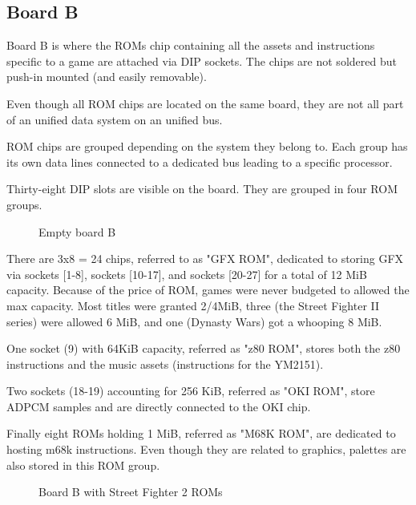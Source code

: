 \label{fig:boarda}

\label{fig:drawboarda}

\subsection{Board B}
   Board B is where the ROMs chip containing all the assets and instructions specific to a game are attached via DIP sockets. The chips are not soldered but push-in mounted (and easily removable).

   Even though all ROM chips are located on the same board, they are not all part of an unified data system on an unified bus. 

   ROM chips are grouped depending on the system they belong to. Each group has its own data lines connected to a dedicated bus leading to a specific processor. 

   Thirty-eight DIP slots are visible on the board. They are grouped in four ROM groups. 

\vfill
\begin{figure}[H] \label{boardb_no_chips}
  \caption*{Empty board B}
  \end{figure}
\pagebreak

   There are 3x8 = 24 chips, referred to as "GFX ROM", dedicated to storing GFX via sockets [1-8], sockets [10-17], and sockets [20-27] for a total of 12 MiB capacity. Because of the price of ROM, games were never budgeted to allowed the max capacity. Most titles were granted 2/4MiB, three (the Street Fighter II series) were allowed 6 MiB, and one (Dynasty Wars) got a whooping 8 MiB.

   One socket (9) with 64KiB capacity, referred as "z80 ROM", stores both the z80 instructions and the music assets (instructions for the YM2151). 

   Two sockets (18-19) accounting for 256 KiB, referred as "OKI ROM", store ADPCM samples and are directly connected to the OKI chip. 

   Finally eight ROMs holding 1 MiB, referred as "M68K ROM", are dedicated to hosting m68k instructions. Even though they are related to graphics, palettes are also stored in this ROM group. 


\vfill
\begin{figure}[H]
  \caption*{Board B with Street Fighter 2 ROMs}
  \end{figure}
\pagebreak


